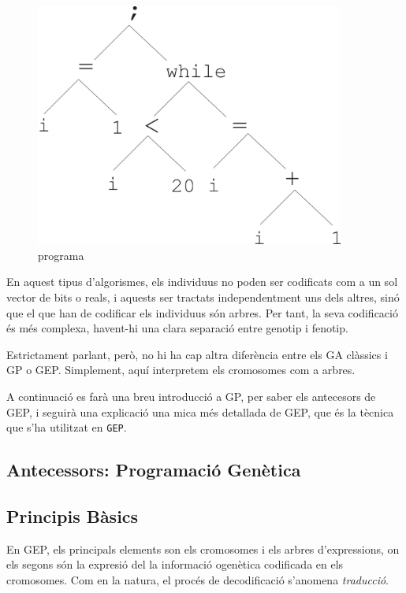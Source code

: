\documentclass[titlepage,a4paper,12pt]{book}
\begin{document}
\begin{figure} \centering \includegraphics[width=4in]{intro/6-3.jpg}
\caption{\label{fig:6-3}programa}
\end{figure}
En aquest tipus d'algorismes, els individuus no poden ser codificats com a un
sol vector de bits o reals, i aquests ser tractats independentment uns dels
altres, sinó que el que han de codificar els individuus són arbres.  Per tant,
la seva codificació és més complexa, havent-hi una clara separació entre genotip
i fenotip.

Estrictament parlant, però, no hi ha cap altra diferència entre els GA clàssics
i GP o GEP.  Simplement, aquí interpretem els cromosomes com a arbres.

A continuació es farà una breu introducció a GP, per saber els antecesors de
GEP, i seguirà una explicació una mica més detallada de GEP, que és la tècnica
que s'ha utilitzat en \texttt{GEP}.

\subsection{Antecessors: Programació Genètica} %
\label{sub:Ant. Programacio Genetica}


\subsection{Principis Bàsics} %
\label{sub:Principis Basics}

En GEP, els principals elements son els cromosomes i els arbres d'expressions,
on els segons són la expresió del la informació ogenètica codificada en els
cromosomes.  Com en la natura, el procés de decodificació s'anomena
\emph{traducció}.
\end{document}

